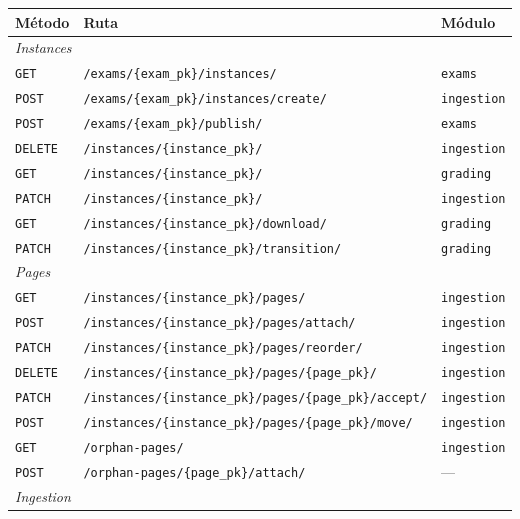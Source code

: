 \begin{table}[htbp]
  \centering
  \footnotesize
  \begin{tabular}{llp{3.6cm}}
    \toprule
    \textbf{Método} & \textbf{Ruta} & \textbf{Módulo} \\
    \midrule
    \multicolumn{3}{l}{\textit{Instances}} \\
    \texttt{GET} & \texttt{/exams/\{exam\_pk\}/instances/} & \texttt{exams} \\
    \texttt{POST} & \texttt{/exams/\{exam\_pk\}/instances/create/} & \texttt{ingestion} \\
    \texttt{POST} & \texttt{/exams/\{exam\_pk\}/publish/} & \texttt{exams} \\
    \texttt{DELETE} & \texttt{/instances/\{instance\_pk\}/} & \texttt{ingestion} \\
    \texttt{GET} & \texttt{/instances/\{instance\_pk\}/} & \texttt{grading} \\
    \texttt{PATCH} & \texttt{/instances/\{instance\_pk\}/} & \texttt{ingestion} \\
    \texttt{GET} & \texttt{/instances/\{instance\_pk\}/download/} & \texttt{grading} \\
    \texttt{PATCH} & \texttt{/instances/\{instance\_pk\}/transition/} & \texttt{grading} \\
    \midrule
    \multicolumn{3}{l}{\textit{Pages}} \\
    \texttt{GET} & \texttt{/instances/\{instance\_pk\}/pages/} & \texttt{ingestion} \\
    \texttt{POST} & \texttt{/instances/\{instance\_pk\}/pages/attach/} & \texttt{ingestion} \\
    \texttt{PATCH} & \texttt{/instances/\{instance\_pk\}/pages/reorder/} & \texttt{ingestion} \\
    \texttt{DELETE} & \texttt{/instances/\{instance\_pk\}/pages/\{page\_pk\}/} & \texttt{ingestion} \\
    \texttt{PATCH} & \texttt{/instances/\{instance\_pk\}/pages/\{page\_pk\}/accept/} & \texttt{ingestion} \\
    \texttt{POST} & \texttt{/instances/\{instance\_pk\}/pages/\{page\_pk\}/move/} & \texttt{ingestion} \\
    \texttt{GET} & \texttt{/orphan-pages/} & \texttt{ingestion} \\
    \texttt{POST} & \texttt{/orphan-pages/\{page\_pk\}/attach/} & --- \\
    \midrule
    \multicolumn{3}{l}{\textit{Ingestion}} \\

\end{tabular}
\end{table}
